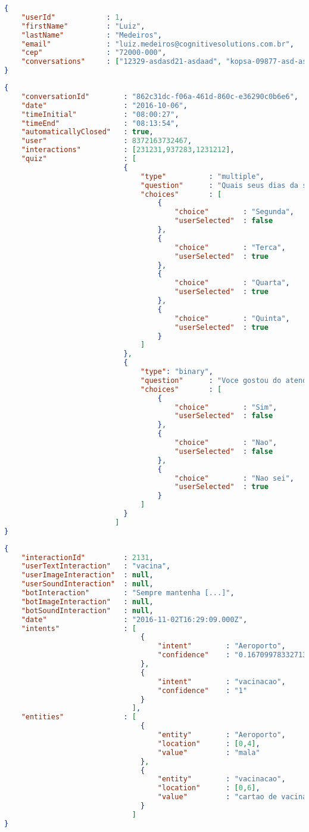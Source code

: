 
\medskip
\begin{lstlisting}[language=json, caption= Exemplo da estrutura User de dados já no formato MongoDB, label={list:UserJsonSample}]
{
	"userId" 			: 1,
	"firstName" 		: "Luiz",
	"lastName"  		: "Medeiros",
	"email"				: "luiz.medeiros@cognitivesolutions.com.br",
	"cep"				: "72000-000",
	"conversations"		: ["12329-asdasd21-asdaad", "kopsa-09877-asd-asdad"]
}
\end{lstlisting}

\medskip
\begin{lstlisting}[language=json, caption= Exemplo da estrutura Conversation de dados já no formato MongoDB, label={list:ConversationJsonSample}]
{
	"conversationId" 		: "862c31dc-f06a-461d-860c-e36290c0b6e6",
	"date"		 			: "2016-10-06",
	"timeInitial"  			: "08:00:27",
	"timeEnd"				: "08:13:54",
	"automaticallyClosed"	: true,
	"user"					: 8372163732467,
	"interactions"			: [231231,937283,1231212],
	"quiz"					: [
							{
								"type"			: "multiple",
								"question"		: "Quais seus dias da semana preferidos?",
								"choices"		: [
									{
										"choice" 		: "Segunda",
										"userSelected"	: false
									},
									{
										"choice" 		: "Terca",
										"userSelected"	: true
									},
									{
										"choice" 		: "Quarta",
										"userSelected"	: true
									},
									{
										"choice" 		: "Quinta",
										"userSelected"	: true
									}
								]
							}, 
							{
								"type": "binary",
								"question"		: "Voce gostou do atendimento?",
								"choices"		: [
									{
										"choice" 		: "Sim",
										"userSelected"	: false
									},
									{
										"choice" 		: "Nao",
										"userSelected"	: false
									},
									{
										"choice" 		: "Nao sei",
										"userSelected"	: true
									}
								]
							}
						  ]
}

\end{lstlisting}

\newpage
\medskip
\begin{lstlisting}[language=json, caption= Exemplo da estrutura Interaction de dados já no formato MongoDB, label={list:InteractionJsonSample}]
{
	"interactionId" 		: 2131,
	"userTextInteraction" 	: "vacina",
	"userImageInteraction"	: null,
	"userSoundInteraction"	: null,
	"botInteraction"  		: "Sempre mantenha [...]",
	"botImageInteraction"	: null,
	"botSoundInteraction"	: null,
	"date"					: "2016-11-02T16:29:09.000Z",
	"intents"				: [
								{
									"intent" 		: "Aeroporto",
									"confidence"	: "0.16709978332713935"
								},
								{
									"intent" 		: "vacinacao",
									"confidence"	: "1"
								}
							  ],
	"entities"				: [
								{
									"entity" 		: "Aeroporto",
									"location"		: [0,4],
									"value"			: "mala"
								},
								{
									"entity" 		: "vacinacao",
									"location"		: [0,6],
									"value"			: "cartao de vacinacao"
								}
							  ]
}

\end{lstlisting}